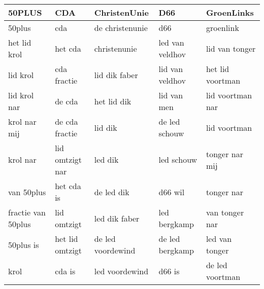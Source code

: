 \begin{tabular}{lllll}
\toprule
             50PLUS &              CDA &       ChristenUnie &              D66 &        GroenLinks \\
\midrule
             50plus &              cda &    de christenunie &              d66 &         groenlink \\
       het lid krol &          het cda &       christenunie &  led van veldhov &    lid van tonger \\
           lid krol &      cda fractie &      lid dik faber &  lid van veldhov &  het lid voortman \\
       lid krol nar &           de cda &        het lid dik &      lid van men &  lid voortman nar \\
       krol nar mij &   de cda fractie &            lid dik &    de led schouw &      lid voortman \\
           krol nar &  lid omtzigt nar &            led dik &       led schouw &    tonger nar mij \\
         van 50plus &       het cda is &         de led dik &          d66 wil &        tonger nar \\
 fractie van 50plus &      lid omtzigt &      led dik faber &     led bergkamp &    van tonger nar \\
          50plus is &  het lid omtzigt &  de led voordewind &  de led bergkamp &    led van tonger \\
               krol &           cda is &     led voordewind &           d66 is &   de led voortman \\
\bottomrule
\end{tabular}
